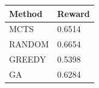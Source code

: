 \begin{tabular}{ll}
\hline
Method & Reward \\
\hline
  MCTS & 0.6514 \\
  RANDOM & 0.6654 \\
  GREEDY & 0.5398 \\
  GA & 0.6284 \\
\hline
\end{tabular}
